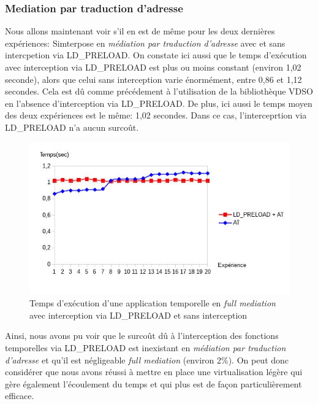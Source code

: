 \subsubsection{Mediation par traduction d'adresse}
Nous allons maintenant voir s'il en est de même pour les deux dernières expériences: Simterpose en \textit{médiation par traduction d'adresse} avec et sans intercpetion via LD\_PRELOAD. On constate ici aussi que le temps d'exécution avec interception via LD\_PRELOAD est plus ou moins constant (environ 1,02 seconde), alors que celui sans interception varie énormément, entre 0,86 et 1,12 secondes. Cela est dû comme précédement à l'utilisation de la bibliothèque VDSO en l'absence d'interception via LD\_PRELOAD. De plus, ici aussi le temps moyen des deux expériences est le même: 1,02 secondes. Dans ce cas, l'interceprtion via LD\_PRELOAD n'a aucun surcoût.

\begin{figure}
  \centering
    \includegraphics[scale=0.65]{mesures/graph/Temps_AT.jpg}
    \caption{Temps d'exécution d'une application temporelle en \textit{full mediation} avec interception via LD\_PRELOAD et sans interception}
    \label{Temps_AT}
\end{figure}

Ainsi, nous avons pu voir que le surcoût dû à l'interception des fonctions temporelles via LD\_PRELOAD est inexistant en \textit{médiation par traduction d'adresse} et qu'il est négligeable \textit{full mediation} (environ 2\%). On peut donc considérer que nous avons réussi à mettre en place une virtualisation légère qui gère également l'écoulement du temps et qui plus est de façon particulièrement efficace.

\vspace{0.5cm}

